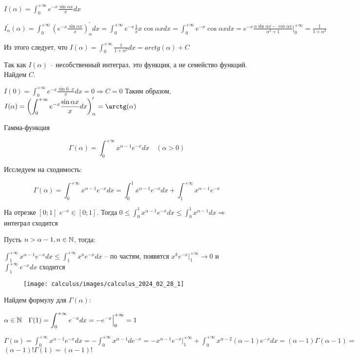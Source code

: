 \documentclass[12pt]{article}
\begin{document}
    \Ex $\displaystyle I(\alpha) = \int^{+\infty}_0 e^{-x} \frac{\sin\alpha x}{x}dx$

    $\displaystyle I^\prime_\alpha(\alpha) = \int^{+\infty}_0 \left(e^{-x} \frac{\sin\alpha x}{x}\right)^\prime_\alpha dx = \int^{+\infty}_0 e^{-x} \frac{1}{x} x \cos\alpha x dx =
    \int^{+\infty}_0 e^{-x} \cos\alpha x dx = e^{-x} \frac{\alpha \sin \alpha x - \cos \alpha x}{\alpha^2 + 1} \Big|^{+\infty}_0 = \frac{1}{1 + \alpha^2}$

    Из этого следует, что $\displaystyle I(\alpha) = \int^{+\infty}_{0} \frac{1}{1 + \alpha^2} dx = arctg(\alpha) + C$

    Так как $I(\alpha)$ -- несобственный интеграл, это функция, а не семейство функций. Найдем $C$.

    $\displaystyle I(0) = \int^{+\infty}_0 e^{-x} \frac{\sin 0 \cdot x}{x}dx = 0 \Longrightarrow C = 0$
    Таким образом, $\displaystyle I(\alpha) = \left(\int^{+\infty}_0 e^{-x} \frac{\sin\alpha x}{x} dx\right)^\prime_\alpha = \arctg(\alpha)$

    \Ex Гамма-функция

    \[\Gamma(\alpha) = \int^{+\infty}_0 x^{\alpha - 1} e^{-x} dx \quad (\alpha > 0)\]

    Исследуем на сходимость:

    \[\Gamma(\alpha) = \int^{+\infty}_0 x^{\alpha - 1} e^{-x} dx = \int^{1}_0 x^{\alpha - 1} e^{-x} dx + \int^{+\infty}_1 x^{\alpha - 1} e^{-x}\]

    На отрезке $[0; 1]$ $e^{-x} \in [0;1]$.
    Тогда $\displaystyle 0 \leq \int^{1}_0 x^{\alpha - 1} e^{-x} dx \leq \int^{1}_0 x^{\alpha - 1} dx \Longrightarrow$ интеграл сходится

    Пусть $n > \alpha - 1, n \in \mathbb{N}$, тогда:

    $\displaystyle \int^{+\infty}_1 x^{\alpha - 1} e^{-x} dx \leq \int^{+\infty}_1 x^{n} e^{-x} dx$ -- по частям, появятся $\displaystyle x^{k} e^{-x} \Big|^{+\infty}_1 \rightarrow 0$ и $\displaystyle \int^{+\infty}_1 e^{-x} dx$ сходится

    \begin{wrapfigure}{r}{0pt}
        \texttt{[image: calculus/images/calculus\_2024\_02\_28\_1]}
    \end{wrapfigure}
    Найдем формулу для $\Gamma(\alpha)$:

    $\displaystyle \alpha \in \mathbb{N} \quad \Gamma(1) = \int^{+\infty}_0 e^{-x} dx = -e^{-x} \Big|^{+\infty}_{0} = 1$

    $\displaystyle \Gamma(\alpha) = \int^{+\infty}_0 x^{\alpha - 1} e^{-x} dx = -\int^{+\infty}_0 x^{\alpha - 1} de^{-x} = -x^{\alpha - 1}e^{-x} \Big|^{+\infty}_1 + \int^{+\infty}_0 x^{\alpha - 2} (\alpha - 1) e^{-x} dx = (\alpha - 1) \Gamma(\alpha - 1) = $
    $(\alpha - 1)! \Gamma(1) = (\alpha - 1)!$
\end{document}
